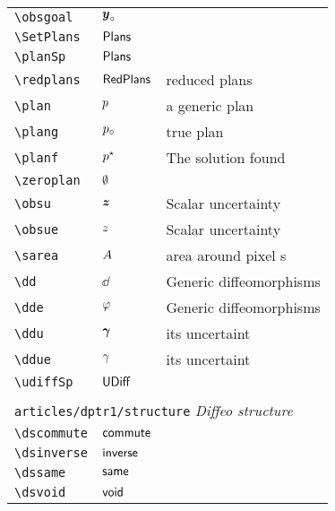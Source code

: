 \begin{longtable}{lll}
 {\color[rgb]{0.5,0.5,0.5}\texttt{\textbackslash obsgoal}} & $\boldsymbol{y}_{\circ}$ & \\ 
 {\color[rgb]{0.5,0.5,0.5}\texttt{\textbackslash SetPlans}} & $\mathsf{Plans}$ & \\ 
 {\color[rgb]{0.5,0.5,0.5}\texttt{\textbackslash planSp}} & $\mathsf{Plans}$ & \\ 
 {\color[rgb]{0.5,0.5,0.5}\texttt{\textbackslash redplans}} & $\mathsf{RedPlans}$ &  reduced plans\\ 
 {\color[rgb]{0.5,0.5,0.5}\texttt{\textbackslash plan}} & $p$ &  a generic plan\\ 
 {\color[rgb]{0.5,0.5,0.5}\texttt{\textbackslash plang}} & $p_{\circ}$ &  true plan\\ 
 {\color[rgb]{0.5,0.5,0.5}\texttt{\textbackslash planf}} & $p^\star$ &  The solution found \\ 
 {\color[rgb]{0.5,0.5,0.5}\texttt{\textbackslash zeroplan}} & $\emptyset$ & \\ 
 {\color[rgb]{0.5,0.5,0.5}\texttt{\textbackslash obsu}} & $\boldsymbol{z}$ &  Scalar uncertainty\\ 
 {\color[rgb]{0.5,0.5,0.5}\texttt{\textbackslash obsue}} & $z$ &  Scalar uncertainty\\ 
 {\color[rgb]{0.5,0.5,0.5}\texttt{\textbackslash sarea}} & $A$ &  area around pixel s\\ 
 {\color[rgb]{0.5,0.5,0.5}\texttt{\textbackslash dd}} & $\dd$ &  Generic diffeomorphisms\\ 
 {\color[rgb]{0.5,0.5,0.5}\texttt{\textbackslash dde}} & $\varphi$ &  Generic diffeomorphisms\\ 
 {\color[rgb]{0.5,0.5,0.5}\texttt{\textbackslash ddu}} & $\boldsymbol{\gamma}$ &  its uncertaint\\ 
 {\color[rgb]{0.5,0.5,0.5}\texttt{\textbackslash ddue}} & $\gamma$ &  its uncertaint\\ 
 {\color[rgb]{0.5,0.5,0.5}\texttt{\textbackslash udiffSp}} & $\mathsf{UDiff}$ & \\ 
  &  & \\ 
 \multicolumn{3}{l}{{\color[rgb]{0.5,0.5,0.5}\texttt{articles/dptr1/structure}} \emph{Diffeo structure}}\\ 
 \hline
{\color[rgb]{0.5,0.5,0.5}\texttt{\textbackslash dscommute}} & $\mathsf{commute}$ & \\ 
 {\color[rgb]{0.5,0.5,0.5}\texttt{\textbackslash dsinverse}} & $\mathsf{inverse}$ & \\ 
 {\color[rgb]{0.5,0.5,0.5}\texttt{\textbackslash dssame}} & $\mathsf{same}$ & \\ 
 {\color[rgb]{0.5,0.5,0.5}\texttt{\textbackslash dsvoid}} & $\mathsf{void}$ & \\ 

\end{longtable}
